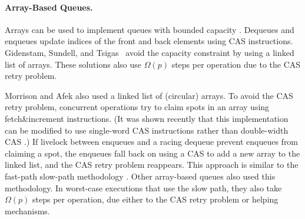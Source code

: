 \paragraph{Array-Based Queues.}
Arrays can be used to implement queues with bounded capacity \cite{DBLP:conf/iceccs/ColvinG05,PMG16,DBLP:conf/icdcn/Shafiei09,DBLP:conf/spaa/TsigasZ01}.  
Dequeues and enqueues update
indices of the front and back elements using CAS instructions.
Gidenstam, Sundell, and Tsigas~\cite{DBLP:conf/opodis/GidenstamST10} avoid
the capacity constraint by using a linked list of arrays.
These solutions also use $\Omega(p)$ steps per operation due to the CAS retry problem.

Morrison and Afek \cite{DBLP:conf/ppopp/MorrisonA13} also used a linked list of (circular) arrays.
To avoid the CAS retry problem, concurrent operations try to claim spots in an array using fetch\&increment instructions.
(It was shown recently that this implementation can be modified to use single-word CAS instructions rather than double-width CAS \cite{RK23}.)
If livelock between enqueues and a racing dequeue prevent enqueues from claiming a spot,
the enqueues fall back on using a CAS to add a new array to the linked list, 
and the CAS retry problem reappears.
This approach is similar to the fast-path slow-path methodology \cite{10.1145/2370036.2145835}.
Other array-based queues \cite{Nik19,10.1145/3490148.3538572,DBLP:conf/ppopp/YangM16} also used this methodology.
In worst-case executions that use the slow path,
they also take $\Omega(p)$ steps per operation, 
due either to the CAS retry problem or helping mechanisms.





